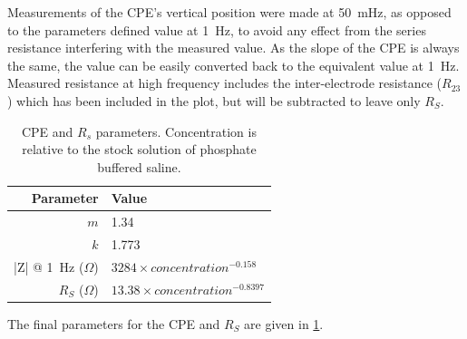       Measurements of the CPE's vertical position were made at \SI{50}{\milli\hertz}, as opposed to the parameters defined value at \SI{1}{\hertz}, to avoid any effect from the series resistance interfering with the measured value.
      As the slope of the CPE is always the same, the value can be easily converted back to the equivalent value at \SI{1}{\hertz}.
      Measured resistance at high frequency includes the inter-electrode resistance ($R_{23}$) which has been included in the plot, but will be subtracted to leave only $R_{S}$.
      \begin{table}
        \centering
        \begin{tabular}{r | l}
          Parameter & Value \\
          \hline
          $m$& 1.34\\
          $k$ & 1.773\\
          |Z| @ \SI{1}{\hertz} ($\Omega$)& $3284 \times concentration^{-0.158}$ \\
          $R_{S}$ ($\Omega$)& $13.38 \times concentration^{-0.8397}$
        \end{tabular}
        \caption{\label{tab:CPEparams}CPE and $R_{s}$ parameters. Concentration is relative to the stock solution of phosphate buffered saline.}
      \end{table}
      The final parameters for the CPE and $R_{S}$ are given in \cref{tab:CPEparams}.

